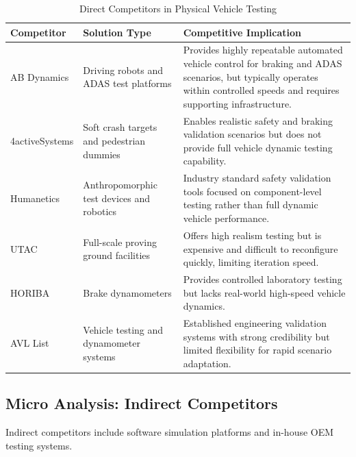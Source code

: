 \documentclass[11pt, a4paper]{report}
\numberwithin{equation}{section}
\begin{document}
\begin{refsection}
\begin{table}[h]
\centering
\caption{Direct Competitors in Physical Vehicle Testing}
\label{tab:direct_competitors}
\footnotesize
\singlespacing
\begin{tabularx}{\textwidth}{|p{2.8cm}|p{3.2cm}|X|}
\hline
\textbf{Competitor} & \textbf{Solution Type} & \textbf{Competitive Implication} \\
\hline
AB Dynamics \cite{abdynamics_testing} & Driving robots and ADAS test platforms & Provides highly repeatable automated vehicle control for braking and ADAS scenarios, but typically operates within controlled speeds and requires supporting infrastructure. \\
\hline
4activeSystems \cite{activesystems_testing} & Soft crash targets and pedestrian dummies & Enables realistic safety and braking validation scenarios but does not provide full vehicle dynamic testing capability. \\
\hline
Humanetics & Anthropomorphic test devices and robotics & Industry standard safety validation tools focused on component-level testing rather than full dynamic vehicle performance. \\
\hline
UTAC \cite{utac_millbrook} & Full-scale proving ground facilities & Offers high realism testing but is expensive and difficult to reconfigure quickly, limiting iteration speed. \\
\hline
HORIBA \cite{horiba_mobility} & Brake dynamometers & Provides controlled laboratory testing but lacks real-world high-speed vehicle dynamics. \\
\hline
AVL List & Vehicle testing and dynamometer systems & Established engineering validation systems with strong credibility but limited flexibility for rapid scenario adaptation. \\
\hline
\end{tabularx}
\end{table}


\subsection{Micro Analysis: Indirect Competitors}

Indirect competitors include software simulation platforms and in-house OEM testing systems. 


\end{refsection}
\end{document}
